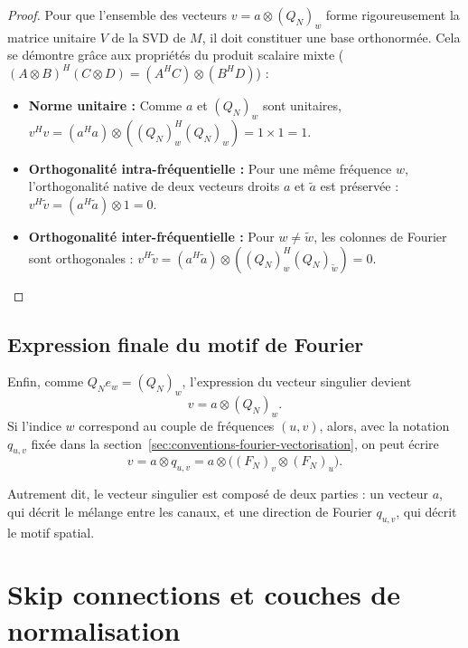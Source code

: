 \begin{proof}

Pour que l'ensemble des vecteurs $v = a \otimes (Q_N)_w$ forme rigoureusement la matrice unitaire $V$ de la SVD de $M$, il doit constituer une base orthonormée. Cela se démontre grâce aux propriétés du produit scalaire mixte ($(A \otimes B)^H (C \otimes D) = (A^H C) \otimes (B^H D)$) :

\begin{itemize}
    \item \textbf{Norme unitaire :} Comme $a$ et $(Q_N)_w$ sont unitaires, $v^H v = (a^H a) \otimes ((Q_N)_w^H (Q_N)_w) = 1 \times 1 = 1$.
    \item \textbf{Orthogonalité intra-fréquentielle :} Pour une même fréquence $w$, l'orthogonalité native de deux vecteurs droits $a$ et $\tilde{a}$ est préservée : $v^H \tilde{v} = (a^H \tilde{a}) \otimes 1 = 0$.
    \item \textbf{Orthogonalité inter-fréquentielle :} Pour $w \neq \tilde{w}$, les colonnes de Fourier sont orthogonales : $v^H \tilde{v} = (a^H \tilde{a}) \otimes ((Q_N)_w^H (Q_N)_{\tilde{w}}) = 0$.

\end{itemize}

\end{proof}

\subsection{Expression finale du motif de Fourier}

Enfin, comme $Q_N e_w = (Q_N)_w$, l'expression du vecteur singulier devient
\[
    v
    =
    a \otimes (Q_N)_w.
\]
Si l'indice $w$ correspond au couple de fréquences $(u,v)$, alors, avec la notation $q_{u,v}$ fixée
dans la section~\ref{sec:conventions-fourier-vectorisation}, on peut écrire
\begin{equation}
    v
    =
    a \otimes q_{u,v}
    =
    a \otimes \bigl((F_N)_v \otimes (F_N)_u\bigr).
    \label{eq:vecteur_singulier_fourier_final}
\end{equation}

Autrement dit, le vecteur singulier est composé de deux parties : un vecteur $a$, qui décrit le
mélange entre les canaux, et une direction de Fourier $q_{u,v}$, qui décrit le motif spatial.

\section{Skip connections et couches de normalisation}
\label{sec:skip-normalisation}

